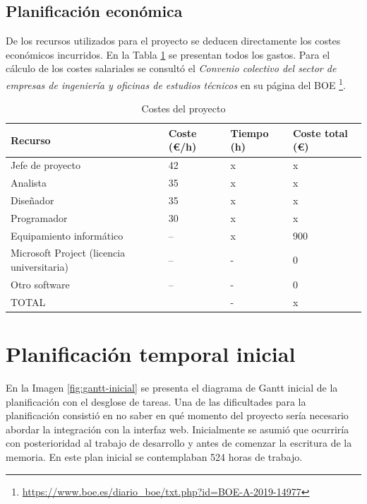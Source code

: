 \subsection{Planificación económica}

De los recursos utilizados para el proyecto se deducen directamente los costes económicos incurridos. En la Tabla \ref{tab:costes-proyecto} se presentan todos los gastos. Para el cálculo de los costes salariales se consultó el \emph{Convenio colectivo del sector de empresas de ingeniería y oficinas de estudios técnicos} en su página del BOE \footnote{\url{https://www.boe.es/diario_boe/txt.php?id=BOE-A-2019-14977}}.

\begin{table}[ht]
    \centering
    \begin{tabular}{l l l l}
        Recurso & Coste (€/h) & Tiempo (h) & Coste total (€) \\
        \hline
        \hline
        Jefe de proyecto & 42 & x & x \\
        Analista & 35 & x & x \\
        Diseñador & 35 & x & x \\
        Programador & 30 & x & x \\
        Equipamiento informático & -- & x & 900 \\
        Microsoft Project (licencia universitaria) & -- & - & 0 \\
		Otro software & -- & - & 0 \\    
        \hline
        \hline
        TOTAL & & - & x \\        
    \end{tabular}
	\caption{Costes del proyecto}    
	\label{tab:costes-proyecto}
\end{table}

\section{Planificación temporal inicial}

En la Imagen \ref{fig:gantt-inicial} se presenta el diagrama de Gantt inicial de la planificación con el desglose de tareas. Una de las dificultades para la planificación consistió en no saber en qué momento del proyecto sería necesario abordar la integración con la interfaz web. Inicialmente se asumió que ocurriría con posterioridad al trabajo de desarrollo y antes de comenzar la escritura de la memoria. En este plan inicial se contemplaban 524 horas de trabajo.

